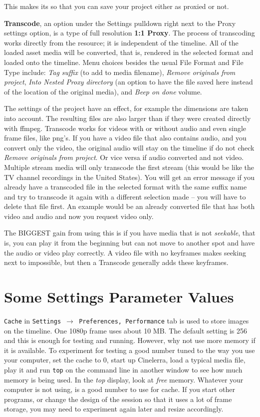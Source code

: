  This makes its so that you can save your project
either as proxied or not.

\textbf{Transcode}, an option under the Settings pulldown right next to the Proxy settings option, is a type of full resolution \textbf{1:1 Proxy}.
The process of transcoding works directly from the resource; it is independent of the timeline. 
All of the loaded asset media will be converted, that is, rendered in the selected format and loaded onto the timeline. 
Menu choices besides the usual File Format and File Type include: \textit{Tag suffix} (to add to media filename), \textit{Remove originals from project}, \textit{Into Nested Proxy directory} (an option to have the file saved here instead of the location of the original media), and \textit{Beep on done} volume.

The settings of the project have an effect, for example the dimensions are taken into account. The resulting files are also larger than if they were created directly with ffmpeg.
Transcode works for videos with or without audio and even single frame files, like png's.
If you have a video file that also contains audio, and you convert only the video, the original audio will stay on the timeline if do not check \textit{Remove originals from project}. Or vice versa if audio converted and not video.
Multiple stream media will only transcode the first stream (this would be like the TV channel recordings in the United States).
You will get an error message if you already have a transcoded file in the selected format with the same suffix name and try to transcode it again with a different selection made -- you will have to delete that file first. An example would be
an already converted file that has both video and audio and now you request video only. 

The BIGGEST gain from using this is if you have media that is not \textit{seekable}, that is, you can play it from the beginning but can not move to another spot and have the audio or video play correctly. A video file with no keyframes makes seeking next to impossible, but then a Transcode generally adds these keyframes. 

\section{Some Settings Parameter Values}%
\label{sec:settings_parameter_values}

\texttt{Cache} in \texttt{Settings $\rightarrow$ Preferences, Performance} tab is used to store images on the timeline.  One 1080p frame uses about 10 MB.  The default setting is 256 and this is enough for testing and running.  However, why not use more memory if it is available.   To experiment for testing a good number tuned to the way you use your computer, set the cache to 0, start up Cinelerra, load a typical media file, play it and run \texttt{top} on the command line in another window to see how much memory is being used.  In the \textit{top} display, look at \textit{free} memory.  Whatever your computer is not using, is a good number to use for cache.  If you start other programs, or change the design of the session so that it uses a lot of frame storage, you may need to experiment again later and resize accordingly.

